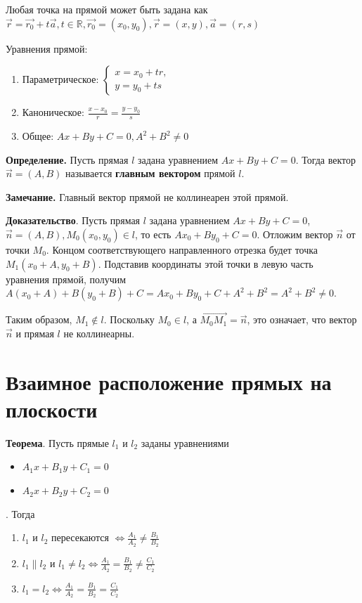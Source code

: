 \documentclass[a4paper]{article}
\begin{document}
Любая точка на прямой может быть задана как $\vec{r} = \vec{r_0} + t\vec{a}, t \in \mathbb{R}, \vec{r_0} = (x_0, y_0), \vec{r} = (x,y), \vec{a} = (r, s)$ 

Уравнения прямой:
\begin{enumerate}


\item Параметрическое: $
 \begin{cases}
   x = x_0 + tr,
   \\
   y = y_0 + ts
 \end{cases}$

\item Каноническое: $\displaystyle \frac{x-x_0}{r} = \frac{y-y_0}{s}$
\item Общее: $Ax + By + C = 0, A^2 + B^2 \neq 0$
\end{enumerate}

\textbf{Определение.} Пусть прямая $l$ задана уравнением $Ax + By + C = 0$. Тогда вектор $\vec{n} = (A, B)$ называется \textbf{главным вектором} прямой $l$.

\textbf{Замечание.} Главный вектор прямой не коллинеарен этой прямой.

\textbf{Доказательство}. Пусть прямая $l$ задана уравнением $Ax + By + C = 0$, $\vec{n} = (A, B), M_0 (x_0, y_0) \in l$, то есть $Ax_0 + By_0 + C = 0$. Отложим вектор $\vec{n}$ от точки $M_0$. Концом соответствующего направленного отрезка будет точка $M_1(x_0 + A, y_0 + B)$. Подставив координаты этой точки в левую часть уравнения прямой, получим $A (x_0 + A) + B(y_0 + B) + C = Ax_0 + By_0 + C + A^2 + B^2 = A^2 + B^2 \neq 0$.

Таким образом, $M_1 \notin l$. Поскольку $M_0 \in l$, а $\overrightarrow{M_0 M_1} = \vec{n}$, это означает, что вектор $\vec{n}$ и прямая $l$ не коллинеарны.

\section*{Взаимное расположение прямых на плоскости}

\textbf{Теорема}. Пусть прямые $l_1$ и $l_2$ заданы уравнениями \begin{itemize}
\item $A_1x+B_1y+C_1 = 0$
\item $A_2x+B_2y+C_2 = 0$
\end{itemize}. Тогда \begin{enumerate}
\item $l_1$ и $l_2$ пересекаются $\displaystyle \Leftrightarrow \frac{A_1}{A_2} \neq \frac{B_1}{B_2}$
\item $\displaystyle l_1 \parallel l_2$ и $\displaystyle l_1 \neq l_2 \Leftrightarrow \frac{A_1}{A_2} = \frac{B_1}{B_2} \neq \frac{C_1}{C_2}$
\item $\displaystyle l_1 = l_2 \Leftrightarrow \frac{A_1}{A_2} = \frac{B_1}{B_2} = \frac{C_1}{C_2}$
\end{enumerate}
\end{document}
